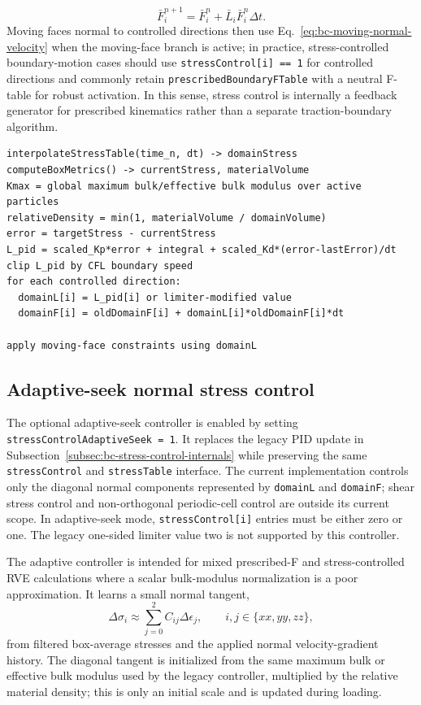 \begin{equation}
  \bar F_i^{n+1}=\bar F_i^n+\bar L_i\bar F_i^n\Delta t.
\end{equation}
Moving faces normal to controlled directions then use Eq.~\eqref{eq:bc-moving-normal-velocity} when the moving-face branch is active; in practice, stress-controlled boundary-motion cases should use \texttt{stressControl[i] == 1} for controlled directions and commonly retain \texttt{prescribedBoundaryFTable} with a neutral F-table for robust activation.  In this sense, stress control is internally a feedback generator for prescribed kinematics rather than a separate traction-boundary algorithm.

\begin{lstlisting}[caption={Stress-control path to boundary motion.}]
interpolateStressTable(time_n, dt) -> domainStress
computeBoxMetrics() -> currentStress, materialVolume
Kmax = global maximum bulk/effective bulk modulus over active particles
relativeDensity = min(1, materialVolume / domainVolume)
error = targetStress - currentStress
L_pid = scaled_Kp*error + integral + scaled_Kd*(error-lastError)/dt
clip L_pid by CFL boundary speed
for each controlled direction:
  domainL[i] = L_pid[i] or limiter-modified value
  domainF[i] = oldDomainF[i] + domainL[i]*oldDomainF[i]*dt

apply moving-face constraints using domainL
\end{lstlisting}

\subsection{Adaptive-seek normal stress control}
\label{subsec:bc-adaptive-seek-stress-control}

The optional adaptive-seek controller is enabled by setting
\texttt{stressControlAdaptiveSeek = 1}.  It replaces the legacy PID update in
Subsection~\ref{subsec:bc-stress-control-internals} while preserving the same
\texttt{stressControl} and \texttt{stressTable} interface.  The current
implementation controls only the diagonal normal components represented by
\texttt{domainL} and \texttt{domainF}; shear stress control and non-orthogonal
periodic-cell control are outside its current scope.  In adaptive-seek mode,
\texttt{stressControl[i]} entries must be either zero or one.  The legacy
one-sided limiter value two is not supported by this controller.

The adaptive controller is intended for mixed prescribed-F and stress-controlled
RVE calculations where a scalar bulk-modulus normalization is a poor
approximation.  It learns a small normal tangent,
\begin{equation}
  \Delta\sigma_i \approx \sum_{j=0}^{2} C_{ij}\Delta\epsilon_j,
  \qquad i,j\in\{xx,yy,zz\},
  \label{eq:bc-adaptive-seek-tangent}
\end{equation}
from filtered box-average stresses and the applied normal velocity-gradient
history.  The diagonal tangent is initialized from the same maximum bulk or
effective bulk modulus used by the legacy controller, multiplied by the relative
material density; this is only an initial scale and is updated during loading.

